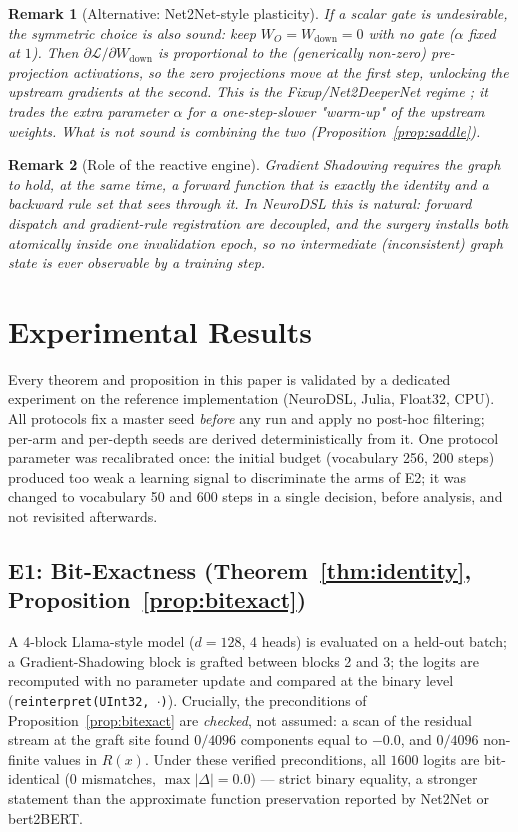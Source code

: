 \documentclass[11pt,a4paper]{article}
\newtheorem{remark}{Remark}
\newcommand{\Loss}{\mathcal{L}}
\begin{document}
\begin{remark}[Alternative: Net2Net-style plasticity]
If a scalar gate is undesirable, the symmetric choice is also sound: keep $W_O = W_{\mathrm{down}} = 0$ with \emph{no} gate ($\alpha$ fixed at $1$). Then $\partial \Loss / \partial W_{\mathrm{down}}$ is proportional to the (generically non-zero) pre-projection activations, so the zero projections move at the first step, unlocking the upstream gradients at the second. This is the Fixup/Net2DeeperNet regime \cite{fixup, net2net}; it trades the extra parameter $\alpha$ for a one-step-slower "warm-up" of the upstream weights. What is \emph{not} sound is combining the two (Proposition~\ref{prop:saddle}).
\end{remark}

\begin{remark}[Role of the reactive engine]
Gradient Shadowing requires the graph to hold, at the same time, a forward function that is exactly the identity and a backward rule set that sees through it. In NeuroDSL this is natural: forward dispatch and gradient-rule registration are decoupled, and the surgery installs both atomically inside one invalidation epoch, so no intermediate (inconsistent) graph state is ever observable by a training step.
\end{remark}

\section{Experimental Results}
\label{sec:experiments}

Every theorem and proposition in this paper is validated by a dedicated experiment on the reference implementation (NeuroDSL, Julia, Float32, CPU). All protocols fix a master seed \emph{before} any run and apply no post-hoc filtering; per-arm and per-depth seeds are derived deterministically from it. One protocol parameter was recalibrated once: the initial budget (vocabulary 256, 200 steps) produced too weak a learning signal to discriminate the arms of E2; it was changed to vocabulary 50 and 600 steps in a single decision, before analysis, and not revisited afterwards.

\subsection{E1: Bit-Exactness (Theorem~\ref{thm:identity}, Proposition~\ref{prop:bitexact})}

A 4-block Llama-style model ($d=128$, 4 heads) is evaluated on a held-out batch; a Gradient-Shadowing block is grafted between blocks 2 and 3; the logits are recomputed with no parameter update and compared at the binary level (\texttt{reinterpret(UInt32, $\cdot$)}). Crucially, the preconditions of Proposition~\ref{prop:bitexact} are \emph{checked}, not assumed: a scan of the residual stream at the graft site found $0/4096$ components equal to $-0.0$, and $0/4096$ non-finite values in $R(x)$. Under these verified preconditions, all $1600$ logits are bit-identical ($0$ mismatches, $\max|\Delta| = 0.0$) --- strict binary equality, a stronger statement than the approximate function preservation reported by Net2Net or bert2BERT.
\end{document}
